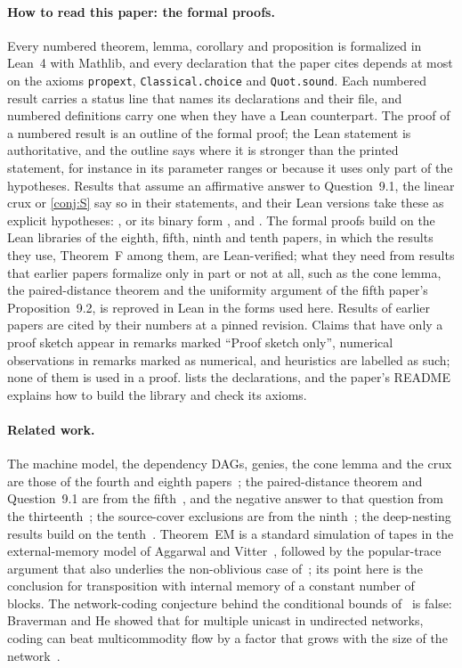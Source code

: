 \paragraph{How to read this paper: the formal proofs.} Every numbered theorem, lemma, corollary and proposition is
formalized in Lean~4 with Mathlib, and every declaration that the paper cites depends at most on the axioms
\texttt{propext}, \texttt{Classical.choice} and \texttt{Quot.sound}. Each numbered result carries a status line that names
its declarations and their file, and numbered definitions carry one when they have a Lean counterpart. The proof of a
numbered result is an outline of the formal proof; the Lean statement is authoritative, and the outline says where it
is stronger than the printed statement, for instance in its parameter ranges or because it uses only part of the
hypotheses. Results that assume an affirmative answer to Question~9.1, the linear crux or \cref{conj:S} say so in their
statements, and their Lean versions take these as explicit hypotheses: , or its binary form
,  and . The formal proofs build on the
Lean libraries of the eighth, fifth, ninth and tenth papers, in which the results they use, Theorem~F among them, are
Lean-verified; what they need from results that earlier papers formalize only in part or not at all, such as the cone
lemma, the paired-distance theorem and the uniformity argument of the fifth paper's Proposition~9.2, is reproved in Lean
in the forms used here. Results of earlier papers are cited by their numbers at a pinned revision. Claims that have only a
proof sketch appear in remarks marked ``Proof sketch only'', numerical observations in remarks marked as numerical, and
heuristics are labelled as such; none of them is used in a proof.  lists the declarations, and the
paper's README explains how to build the library and check its axioms.

\paragraph{Related work.} The machine model, the dependency DAGs, genies, the cone lemma and the crux are those of the
fourth and eighth papers~\cite{FourthPaper2026,BoundedNesting2026}; the paired-distance theorem and Question~9.1 are from
the fifth~\cite{DirectedRecovery2026}, and the negative answer to that question from the
thirteenth~\cite{StorageCodes2026}; the source-cover exclusions are from the ninth~\cite{SourceCovers2026}; the
deep-nesting results build on the tenth~\cite{DirectedReciprocity2026}. Theorem~EM is a standard simulation of tapes in
the external-memory model of Aggarwal and Vitter~\cite{AggarwalVitter1988}, followed by the popular-trace argument that
also underlies the non-oblivious case of~\cite{FHLS2019}; its point here is the conclusion for transposition with
internal memory of a constant number of blocks. The network-coding conjecture behind the conditional bounds
of~\cite{FHLS2019} is false: Braverman and He showed that for multiple unicast in undirected networks, coding can beat
multicommodity flow by a factor that grows with the size of the network~\cite{BravermanHe2026}.

